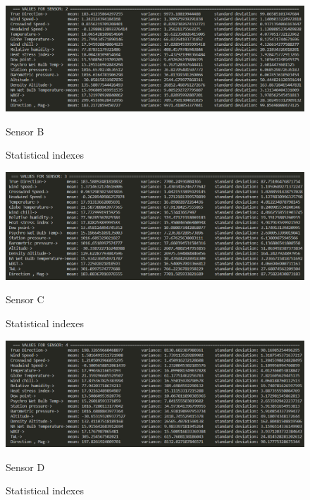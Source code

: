 \documentclass[a4paper]{article}
\begin{document}
        \begin{figure}[H]
            \centering
            \includegraphics[width=\textwidth]{images/sensor_2.PNG}
            \caption{Sensor B}
            \caption{Statistical indexes}
            
        \end{figure}

        \begin{figure}[H]
            \centering
            \includegraphics[width=\textwidth]{images/sensor_3.PNG}
            \caption{Sensor C}
            \caption{Statistical indexes}
        
        \end{figure}

        \begin{figure}[H]
            \centering
            \includegraphics[width=\textwidth]{images/sensor_4.PNG}
            \caption{Sensor D}
            \caption{Statistical indexes}
            
        \end{figure}
\end{document}
